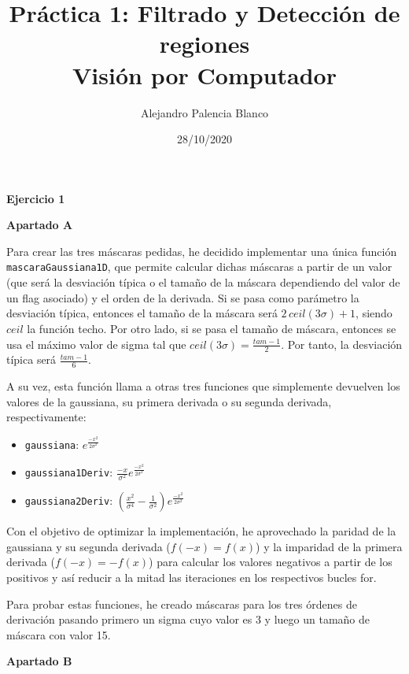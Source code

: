 \documentclass[10pt,a4paper]{article}
\title{
Práctica 1: Filtrado y Detección de regiones\\
\large Visión por Computador \\
}
\author{
Alejandro Palencia Blanco\\
}
\date{28/10/2020}
\begin{document}
\maketitle


\textbf{\huge Ejercicio 1}
\hfill \break

\begin{list}{•}{}

\item \textbf{\large Apartado A}

Para crear las tres máscaras pedidas, he decidido implementar una única función \texttt{mascaraGaussiana1D}, que permite calcular dichas máscaras a partir de un valor (que será la desviación típica o el tamaño de la máscara dependiendo del valor de un flag asociado) y el orden de la derivada. Si se pasa como parámetro la desviación típica, entonces el tamaño de la máscara será $2 \, ceil(3 \sigma) + 1$, siendo $ceil$ la función techo. Por otro lado, si se pasa el tamaño de máscara, entonces se usa el máximo valor de sigma tal que $ceil(3 \sigma) = \frac{tam-1}{2}$. Por tanto, la desviación típica será $\frac{tam-1}{6}$.

A su vez, esta función llama a otras tres funciones que simplemente devuelven los valores de la gaussiana, su primera derivada o su segunda derivada, respectivamente:

\begin{itemize}
\item \texttt{gaussiana}: $e^{\frac{-x^2}{2\sigma^2}}$
\item \texttt{gaussiana1Deriv}: $\frac{-x}{\sigma^2}e^{\frac{-x^2}{2\sigma^2}}$
\item \texttt{gaussiana2Deriv}: $\left( \frac{x^2}{\sigma^4} - \frac{1}{\sigma^2} \right) e^{\frac{-x^2}{2\sigma^2}}$
\end{itemize}

Con el objetivo de optimizar la implementación, he aprovechado la paridad de la gaussiana y su segunda derivada ($f(-x)=f(x)$) y la imparidad de la primera derivada ($f(-x)=-f(x)$) para calcular los valores negativos a partir de los positivos y así reducir a la mitad las iteraciones en los respectivos bucles for.

Para probar estas funciones, he creado máscaras para los tres órdenes de derivación pasando primero un sigma cuyo valor es 3 y luego un tamaño de máscara con valor 15.

\hfill \break




\item \textbf{\large Apartado B}


\end{list}
\end{document}
